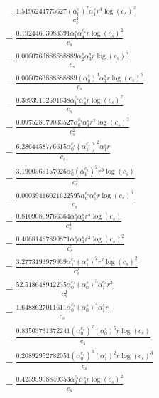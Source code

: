\documentclass[10pt]{article}
\begin{document}
\begin{align*}
&{}  - \frac{1.5196244773627 \left(\alpha_{0}^s\right)^{2} \alpha_{1}^s r^{4} \log{\left(c_{s} \right)}^{2}}{c_{s}^{4}} \\
&{}  - \frac{0.19244603083391 \alpha_{1}^s \alpha_{4}^{c_s} r \log{\left(c_{s} \right)}^{2}}{c_{s}} \\
&{}  - \frac{0.0060763888888889 \alpha_{2}^s \alpha_{3}^s r \log{\left(c_{s} \right)}^{6}}{c_{s}} \\
&{}  - \frac{0.0060763888888889 \left(\alpha_{0}^s\right)^{3} \alpha_{3}^s r \log{\left(c_{s} \right)}^{6}}{c_{s}} \\
&{}  - \frac{0.38939102591638 \alpha_{1}^{c_s} \alpha_{4}^s r \log{\left(c_{s} \right)}^{2}}{c_{s}} \\
&{}  - \frac{0.097528679033527 \alpha_{0}^{c_s} \alpha_{4}^s r^{2} \log{\left(c_{s} \right)}^{3}}{c_{s}^{2}} \\
&{}  - \frac{6.2864458776615 \alpha_{0}^{c_s} \left(\alpha_{1}^{c_s}\right)^{2} \alpha_{1}^s r}{c_{s}} \\
&{}  - \frac{3.1900565157026 \alpha_{0}^s \left(\alpha_{1}^{c_s}\right)^{2} r^{3} \log{\left(c_{s} \right)}}{c_{s}^{3}} \\
&{}  - \frac{0.00039416021622595 \alpha_{0}^{c_s} \alpha_{5}^s r \log{\left(c_{s} \right)}^{6}}{c_{s}} \\
&{}  - \frac{0.81090809766364 \alpha_{0}^s \alpha_{2}^s r^{4} \log{\left(c_{s} \right)}}{c_{s}^{4}} \\
&{}  - \frac{0.40681487890871 \alpha_{0}^s \alpha_{3}^s r^{3} \log{\left(c_{s} \right)}^{2}}{c_{s}^{3}} \\
&{}  - \frac{3.2773193979939 \alpha_{1}^{c_s} \left(\alpha_{1}^s\right)^{2} r^{2} \log{\left(c_{s} \right)}^{2}}{c_{s}^{2}} \\
&{}  - \frac{52.518648942235 \alpha_{0}^{c_s} \left(\alpha_{0}^s\right)^{3} \alpha_{1}^{c_s} r^{2}}{c_{s}^{2}} \\
&{}  - \frac{1.6488627011611 \alpha_{0}^{c_s} \left(\alpha_{0}^s\right)^{4} \alpha_{1}^s r}{c_{s}} \\
&{}  - \frac{0.83503731372241 \left(\alpha_{0}^{c_s}\right)^{2} \left(\alpha_{0}^s\right)^{5} r \log{\left(c_{s} \right)}}{c_{s}} \\
&{}  - \frac{0.20892952782051 \left(\alpha_{0}^{c_s}\right)^{3} \left(\alpha_{1}^s\right)^{2} r \log{\left(c_{s} \right)}^{3}}{c_{s}} \\
&{}  - \frac{0.42395958840353 \alpha_{2}^{c_s} \alpha_{3}^s r \log{\left(c_{s} \right)}^{2}}{c_{s}} \\

\end{align*}
\end{document}
